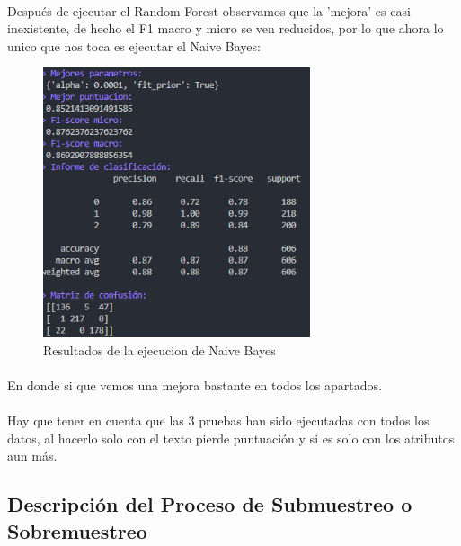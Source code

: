 \documentclass{report}
\begin{document}
                \paragraph*{}{
                Después de ejecutar el Random Forest observamos que la 'mejora' es casi inexistente, de hecho el F1 macro y micro se ven reducidos, por lo que ahora lo unico que nos toca es ejecutar el Naive Bayes:
                }
                \begin{figure}[H]
                    \centering
                    \includegraphics[width=0.7\textwidth]{img/SMOTE.png}
                    \caption{Resultados de la ejecucion de Naive Bayes}
                \end{figure}
                \paragraph*{}{
                    En donde si que vemos una mejora bastante en todos los apartados.
                }
               \paragraph*{}{
                   Hay que tener en cuenta que las 3 pruebas han sido ejecutadas con todos los datos, al hacerlo solo con el texto pierde puntuación y si es solo con los atributos aun más.
               }
            \clearpage\subsection{Descripción del Proceso de Submuestreo o Sobremuestreo}
\end{document}
